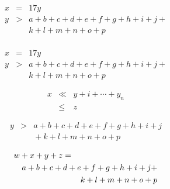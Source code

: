 \documentclass{article}
\begin{document}
\begin{eqnarray}
x & = & 17y \label{e1}\\
y & > & a + b + c + d + e + f + g + h + i + j + \nonumber \\
  &   & k + l + m + n + o + p \label{e2} \\
\end{eqnarray}

\begin{eqnarray}
x & = & 17y \label{e3}\\
y & > & a + b + c + d + e + f + g + h + i + j + \nonumber \\
  &   & k + l + m + n + o + p \label{e4}
\end{eqnarray}

\begin{eqnarray*}
  x & \ll & y+i + \cdots + y_n \\
    & \leq & z
\end{eqnarray*}

\begin{eqnarray*}
y & > & a + b + c + d + e + f + g + h + i + j\\
  &   & \mbox{} + k + l + m + n + o + p
\end{eqnarray*}

\begin{eqnarray*}
\lefteqn{w+x+y+z=}\\
  & & a + b + c + d + e + f + g + h + i + j + \\
  & & k + l + m + n + o + p
\end{eqnarray*}
\end{document}
